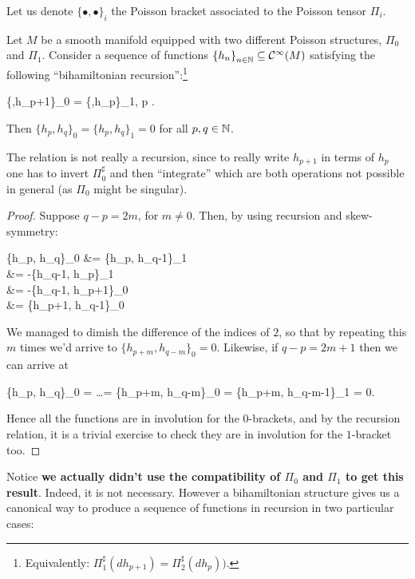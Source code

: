 \documentclass[main.tex]{subfiles}
\begin{document}
Let us denote $\{\bullet,\bullet\}_i$ the Poisson bracket associated to the Poisson tensor $\Pi_i$.

\begin{theorem}
\label{th:magri}
	Let $M$ be a smooth manifold equipped with two different Poisson structures, $\Pi_0$ and $\Pi_1$. Consider a sequence of functions $\left\{h_{n}\right\}_{n \in \mathbb{N}} \subseteq \mathcal{C}^\infty(M)$ satisfying the following ``bihamiltonian recursion'':\footnote{Equivalently: $\Pi_1^\sharp (dh_{p+1}) = \Pi_2^\sharp(dh_p))$.}
	\begin{eqalign}
		\{\bullet,h_{p+1}\}_0 = \{\bullet,h_p\}_1, \quad \forall p \in \N.
	\end{eqalign}
	Then $\{h_p,h_q\}_0 = \{h_p,h_q\}_1 = 0$ for all $p,q \in \mathbb{N}$.
\end{theorem}
\begin{remark}
	The relation is not really a recursion, since to really write $h_{p+1}$ in terms of $h_p$ one has to invert $\Pi_0^\sharp$ and then ``integrate'' which are both operations not possible in general (as $\Pi_0$ might be singular).
\end{remark}
\begin{proof}
	Suppose $q-p=2m$, for $m \neq 0$. Then, by using recursion and skew-symmetry:
	\begin{eqalign}
		\{h_p, h_q\}_0 &= \{h_p, h_{q-1}\}_1\\
		&= -\{h_{q-1}, h_p\}_1\\
		&= -\{h_{q-1}, h_{p+1}\}_0\\
		&= \{h_{p+1}, h_{q-1}\}_0
	\end{eqalign}
	We managed to dimish the difference of the indices of $2$, so that by repeating this $m$ times we'd arrive to $\{h_{p+m}, h_{q-m}\}_0 =0$. Likewise, if $q-p = 2m+1$ then we can arrive at
	\begin{eqalign}
		\{h_p, h_q\}_0 = \ldots = \{h_{p+m}, h_{q-m}\}_0 = \{h_{p+m}, h_{q-m-1}\}_1 = 0.
	\end{eqalign}
	Hence all the functions are in involution for the $0$-brackets, and by the recursion relation, it is a trivial exercise to check they are in involution for the $1$-bracket too.
\end{proof}

Notice \textbf{we actually didn't use the compatibility of $\Pi_0$ and $\Pi_1$ to get this result}. Indeed, it is not necessary. However a bihamiltonian structure gives us a canonical way to produce a sequence of functions in recursion in two particular cases:
\end{document}
